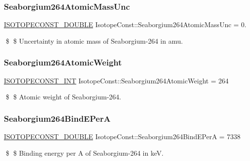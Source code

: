 \subsubsection{\texorpdfstring{Seaborgium264\+Atomic\+Mass\+Unc}{Seaborgium264AtomicMassUnc}}
{\footnotesize\ttfamily \mbox{\hyperlink{group___isotope_const-_macros_ga8f45a7272ce02c0b4c65c44636ed719a}{I\+S\+O\+T\+O\+P\+E\+C\+O\+N\+S\+T\+\_\+\+D\+O\+U\+B\+LE}} Isotope\+Const\+::\+Seaborgium264\+Atomic\+Mass\+Unc = 0.}

\$ \$ Uncertainty in atomic mass of Seaborgium-\/264 in amu. \mbox{\label{group___isotope_const-_seaborgium-_sg264_ga125ecd1d011ca85443012e92904d4a0f}} 
\subsubsection{\texorpdfstring{Seaborgium264\+Atomic\+Weight}{Seaborgium264AtomicWeight}}
{\footnotesize\ttfamily \mbox{\hyperlink{group___isotope_const-_macros_ga5f18360b3e99483a35c32d789e62621c}{I\+S\+O\+T\+O\+P\+E\+C\+O\+N\+S\+T\+\_\+\+I\+NT}} Isotope\+Const\+::\+Seaborgium264\+Atomic\+Weight = 264}

\$ \$ Atomic weight of Seaborgium-\/264. \mbox{\label{group___isotope_const-_seaborgium-_sg264_gad968051bb69fe17c6aa990463b2af106}} 
\subsubsection{\texorpdfstring{Seaborgium264\+Bind\+E\+PerA}{Seaborgium264BindEPerA}}
{\footnotesize\ttfamily \mbox{\hyperlink{group___isotope_const-_macros_ga8f45a7272ce02c0b4c65c44636ed719a}{I\+S\+O\+T\+O\+P\+E\+C\+O\+N\+S\+T\+\_\+\+D\+O\+U\+B\+LE}} Isotope\+Const\+::\+Seaborgium264\+Bind\+E\+PerA = 7338}

\$ \$ Binding energy per A of Seaborgium-\/264 in keV. \mbox{\label{group___isotope_const-_seaborgium-_sg264_ga533f328a3f3ba5da195679e43825bc49}} 
